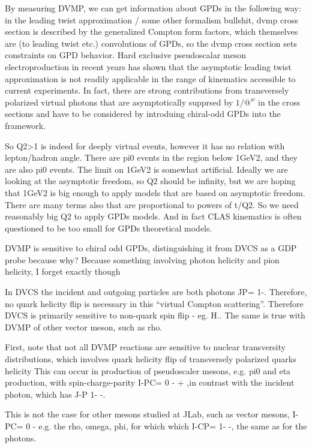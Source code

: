         By measuring DVMP, we can get information about GPDs in the following way: in the leading twist approximation / some other formalism bullshit, dvmp cross section is described by the generalized Compton form factors, which themselves are (to leading twist etc.) convolutions of GPDs, so the dvmp cross section sets constraints on GPD behavior. Hard exclusive pseudoscalar meson electroproduction in recent years has shown that the asymptotic leading twist approximation is not readily applicable in the range of kinematics accessible to current experiments. In fact, there are strong contributions from transversely polarized virtual photons that are asymptotically supprsed by $1/@^w$ in the cross sections and have to be considered by introduing chiral-odd GPDs into the framework.   
        
        So Q2>1 is indeed for deeply virtual events, however it has no relation with lepton/hadron angle. There are pi0 events in the region below 1GeV2, and they are also pi0 events. The limit on 1GeV2 is somewhat artificial. Ideally we are looking at the asymptotic freedom, so Q2 should be infinity, but we are hoping that 1GeV2 is big enough to apply models that are based on asymptotic freedom. There are many terms also that are proportional to powers of t/Q2. So we need reasonably big Q2 to apply GPDs models. And in fact CLAS kinematics is often questioned to be too small for GPDs theoretical models.
        
        DVMP is sensitive to chiral odd GPDs, distinguishing it from DVCS as a GDP probe because why? Because something involving photon helicity and pion helicity, I forget exactly though


            In DVCS the  incident and  outgoing particles are both photons JP= 1-. Therefore, no quark helicity flip is necessary in this “virtual Compton scattering”.  Therefore DVCS is primarily sensitive to non-quark spin flip - eg. H.. The same is true with DVMP of other vector meson, such as rho.
            
    
            First, note that not all DVMP reactions are sensitive to nuclear transversity distributions, which involves quark helicity flip of transversely polarized quarks helicity  This can occur in  production of pseudoscaler mesons,  e.g. pi0 and eta production, with spin-charge-parity  I-PC= 0 - + ,in contrast with  the incident photon, which  has J-P 1- -. 
            
            This is not the case for other mesons studied at JLab, such as vector mesons, I-PC= 0 - e.g. the rho, omega, phi, for which which I-CP= 1- -, the same as for the photons.   
            
